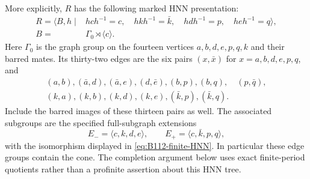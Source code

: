 More explicitly, $R$ has the following marked HNN presentation:
\begin{equation}\label{eq:B112-finite-HNN}
 \begin{split}
 R=\langle B,h\mid{}&hch^{-1}=c,\quad hkh^{-1}=\bar k,\quad
       hdh^{-1}=p,\quad heh^{-1}=q\rangle,\\
 B={}&\Gamma_0\rtimes\langle c\rangle.
 \end{split}
\end{equation}
Here $\Gamma_0$ is the graph group on the fourteen vertices
$a,b,d,e,p,q,k$ and their barred mates. Its thirty-two edges are
the six pairs $(x,\bar x)$ for $x=a,b,d,e,p,q$, and
\begin{equation}\label{eq:B112-finite-edges}
 \begin{gathered}
 (a,b),(\bar a,d),(\bar a,e),(d,\bar e),(b,p),(b,q),\quad
 (p,\bar q),\\
 (k,a),(k,b),(k,d),(k,e),(\bar k,p),(\bar k,q).
 \end{gathered}
\end{equation}
Include the barred images of these thirteen pairs as well.
The associated subgroups are the specified full-subgraph extensions
\[
 E_- =\langle c,k,d,e\rangle,
 \qquad E_+=\langle c,\bar k,p,q\rangle,
\]
with the isomorphism displayed in \eqref{eq:B112-finite-HNN}.
In particular these edge groups contain the cone. The completion
argument below uses exact finite-period quotients rather than a
profinite assertion about this HNN tree.


